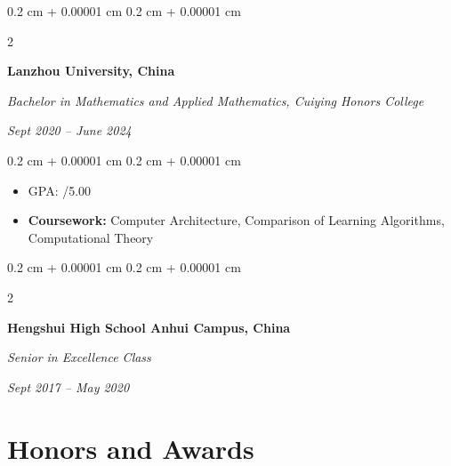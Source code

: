 \documentclass[10pt, letterpaper]{article}
\newenvironment{highlights}{
    \begin{itemize}[
        topsep=0.10 cm,
        parsep=0.10 cm,
        partopsep=0pt,
        itemsep=0pt,
        leftmargin=0.4 cm + 10pt
    ]
}{
    \end{itemize}
} %
\newenvironment{onecolentry}{
    \begin{adjustwidth}{
        0.2 cm + 0.00001 cm
    }{
        0.2 cm + 0.00001 cm
    }
}{
    \end{adjustwidth}
} %
\newenvironment{twocolentry}[2][]{
    \onecolentry
    \def\secondColumn{#2}
    \setcolumnwidth{\fill, 6.5 cm}
    \begin{paracol}{2}
}{
    \switchcolumn \raggedleft \secondColumn
    \end{paracol}
    \endonecolentry
} %
\let\hrefWithoutArrow\href
\renewcommand{\href}[2]{\hrefWithoutArrow{#1}{\ifthenelse{\equal{#2}{}}{ }{#2 }\raisebox{.15ex}{\footnotesize \faExternalLink*}}}
\begin{document}
    \vspace{0.10 cm}


        
    \begin{twocolentry}{
        
        \textit{Sept 2020 – June 2024}}
            \textbf{Lanzhou University, China}
    
            \textit{Bachelor in Mathematics and Applied Mathematics, Cuiying Honors College}
    \end{twocolentry}
    \begin{onecolentry}
        \begin{highlights}
            \item GPA: \href{https://zhoufy20.github.io/files/cv/cv.pdf}{3.89}/5.00
            \item \textbf{Coursework:} Computer Architecture, Comparison of Learning Algorithms, Computational Theory
        \end{highlights}
    \end{onecolentry}
    \vspace{0.10 cm}

    \begin{twocolentry}{
        
        \textit{Sept 2017 – May 2020}}
            \textbf{Hengshui High School Anhui Campus, China}
    
            \textit{Senior in Excellence Class}
    \end{twocolentry}

    
    \section{Honors and Awards}
\end{document}
